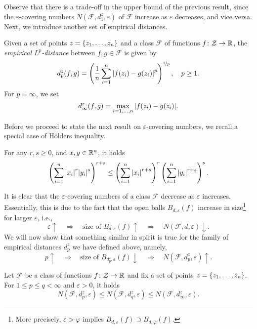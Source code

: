Observe that there is a trade-off in the upper bound of the previous result, since the $\varepsilon$-covering numbers $N(\mathcal{F}, d_1^z, \varepsilon)$ of $\mathcal{F}$ increase as $\varepsilon$ decreases, and vice versa. Next, we introduce another set of empirical distances.

\begin{definition}
Given a set of points $z = \left\{z_1, \dots, z_n\right\}$ and a class $\mathcal{F}$ of functions $f \colon \mathcal{Z} \to \mathbb{R}$, the \emph{empirical $L^p$-distance} between $f, g \in \mathcal{F}$ is given by
\[
    d_p^z(f, g) = \left( \frac{1}{n} \sum_{i=1}^n \abs{f(z_i) - g(z_i)}^p \right)^{\nicefrac{1}{p}}, \quad p \geq 1.
\]
For $p = \infty$, we set
\[
    d_{\infty}^z(f, g) = \max_{i = 1, \dots, n} \abs{f(z_i) - g(z_i)}.
\]
\end{definition}

Before we proceed to state the next result on $\varepsilon$-covering numbers, we recall a special case of H{\"o}lders inequality.

\begin{proposition}[H{\"o}lder, 1889]
\label{prop: hoelder}
For any $r, s \geq 0$, and $x, y \in \mathbb{R}^n$, it holds
\[
    \left( \sum_{i=1}^n \abs{x_i}^r \abs{y_i}^s \right)^{r+s} \leq \left( \sum_{i=1}^n \abs{x_i}^{r+s} \right)^r \left( \sum_{i=1}^n \abs{y_i}^{r+s} \right)^s.
\]
\end{proposition}

It is clear that the $\varepsilon$-covering numbers of a class $\mathcal{F}$ decrease as $\varepsilon$ increases. Essentially, this is due to the fact that the open balls $B_{d, \varepsilon}(f)$ increase in size\footnote{More precisely, $\varepsilon > \varphi$ implies $B_{d, \varepsilon}(f) \supset B_{d, \varphi}(f)$.} for larger $\varepsilon$, i.e.,
\[
    \varepsilon \uparrow \quad \Rightarrow \quad \text{size of } B_{d, \varepsilon}(f) \uparrow \quad \Rightarrow \quad N(\mathcal{F}, d, \varepsilon) \downarrow.
\]
We will now show that something similar in spirit is true for the family of empirical distances $d_p^z$ we have defined above, namely,
\[
    p \uparrow \quad \Rightarrow \quad \text{size of } B_{d_p^z, \varepsilon}(f) \downarrow \quad \Rightarrow \quad N(\mathcal{F}, d_p^z, \varepsilon) \uparrow.
\]

\begin{proposition}
Let $\mathcal{F}$ be a class of functions $f \colon \mathcal{Z} \to \mathbb{R}$ and fix a set of points $z = \left\{z_1, \dots, z_n\right\}$. For $1 \leq p \leq q < \infty$ and $\varepsilon > 0$, it holds
\[
    N(\mathcal{F}, d_p^z, \varepsilon) \leq N(\mathcal{F}, d_q^z, \varepsilon) \leq N(\mathcal{F}, d_{\infty}^z, \varepsilon).
\]
\end{proposition}

